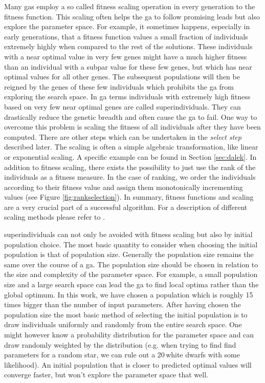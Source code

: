 Many \glspl{ga} employ a so called \gls{fitness} scaling operation in every generation to the \gls{fitness} function. This scaling often helps the \gls{ga} to follow promising leads but also explore the parameter space. For example, it sometimes happens, especially in early generations, that a \gls{fitness} function values a small fraction of individuals extremely highly when compared to the rest of the solutions. These \glspl{individual} with a near optimal value in very few \glspl{gene} might have a much higher \gls{fitness} than an \gls{individual} with a subpar value for these few \glspl{gene}, but which has near optimal values for all other \glspl{gene}. The subsequent populations will then be reigned by the \glspl{gene} of these few individuals which prohibits the \gls{ga} from exploring the search space. In \gls{ga} terms individuals with extremely high fitness based on very few near optimal \glspl{gene} are called \glspl{superindividual}. They can drastically reduce the genetic breadth and often cause the \gls{ga} to fail. One way to overcome this problem is scaling the fitness of all individuals after they have been computed. There are other steps which can be undertaken in the \textit{select step} described later. The scaling is often a simple algebraic transformation, like linear or exponential scaling. A specific example can be found in Section \ref{sec:dalek}. In addition to fitness scaling, there exists the possibility to just use the rank of the individuals as a \gls{fitness} measure. In the case of ranking, we order the \glspl{individual} according to their \gls{fitness} value and assign them monotonically incrementing values (see Figure \ref{fig:rankselection}). In summary, fitness functions and scaling are a very crucial part of a successful algorithm. For a description of different scaling methods please refer to \citet{Kreinovich93geneticalgorithms}.

\Glspl{superindividual} can not only be avoided with \gls{fitness} scaling but also by initial population choice. The most basic quantity to consider when choosing the initial population is that of population size. Generally the population size remains the same over the course of a \gls{ga}. The population size should be chosen in relation to the size and complexity of the parameter space. For example, a small population size and a large search space can lead the \gls{ga} to find local optima rather than the global optimum. In this work, we have chosen a population which is roughly 15 times bigger than the number of input parameters. After having chosen the population size the most basic method of selecting the initial population is to draw individuals uniformly and randomly from the entire search space. One might however know a probability distribution for the parameter space and can draw randomly weighted by the distribution (e.g. when trying to find find parameters for a random star, we can rule out a 20\,\msun white dwarfs with some likelihood). An initial population that is closer to predicted optimal values will converge faster, but won't explore the parameter space that well. 

